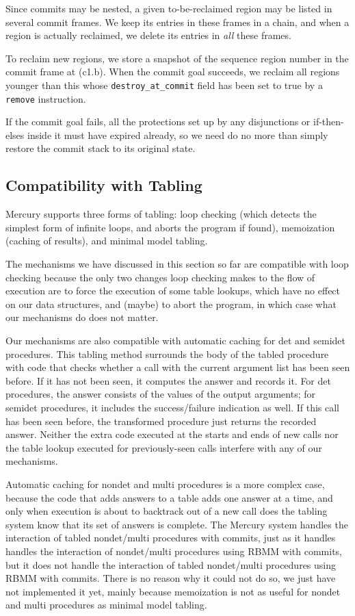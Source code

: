 \documentclass{tlp}
\newcommand{\code}[1]{{\tt#1}}
\begin{document}
Since commits may be nested,
a given to-be-reclaimed region may be listed in several commit frames.
We keep its entries in these frames in a chain,
and when a region is actually reclaimed,
we delete its entries in \emph{all} these frames.

To reclaim new regions,
we store a snapshot of the sequence region number
in the commit frame at (c1.b).
When the commit goal succeeds, we reclaim all regions younger than this
whose \code{destroy\_at\_commit} field has been set to true
by a \code{remove} instruction.

If the commit goal fails,
all the protections set up by any disjunctions or if-then-elses inside it
must have expired already, so we need do no more than
simply restore the commit stack to its original state.

\subsection{Compatibility with Tabling}
\label{seCtabling}

Mercury supports three forms of tabling:
loop checking (which detects the simplest form of infinite loops,
and aborts the program if found),
memoization (caching of results),
and minimal model tabling.

The mechanisms we have discussed in this section so far
are compatible with loop checking
because the only two changes loop checking makes to the flow of execution
are to force the execution of some table lookups,
which have no effect on our data structures,
and (maybe) to abort the program,
in which case what our mechanisms do does not matter.

Our mechanisms are also compatible with automatic caching
for det and semidet procedures.
This tabling method surrounds the body of the tabled procedure
with code that checks whether
a call with the current argument list has been seen before.
If it has not been seen,
it computes the answer and records it.
For det procedures, the answer consists of the values of the output arguments;
for semidet procedures, it includes the success/failure indication as well.
If this call has been seen before,
the transformed procedure just returns the recorded answer.
Neither the extra code executed at the starts and ends of new calls
nor the table lookup executed for previously-seen calls
interfere with any of our mechanisms.

Automatic caching for nondet and multi procedures is a more complex case,
because the code that adds answers to a table adds one answer at a time,
and only when execution is about to backtrack out of a new call
does the tabling system know that its set of answers is complete.
The Mercury system handles the interaction of
tabled nondet/multi procedures with commits,
just as it handles handles the interaction of
nondet/multi procedures using RBMM with commits,
but it does not handle the interaction of
tabled nondet/multi procedures using RBMM with commits.
There is no reason why it could not do so,
we just have not implemented it yet,
mainly because memoization is not as useful
for nondet and multi procedures as minimal model tabling.
\end{document}
